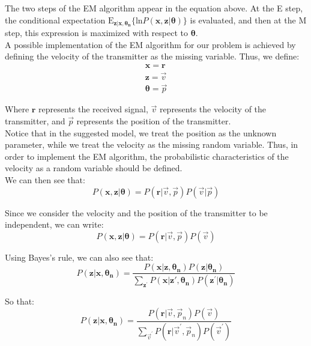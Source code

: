 \documentclass[10pt,a4paper]{report}
\begin{document}
The two steps of the EM algorithm appear in the equation above. At the E step, the conditional expectation $\text{E}_{\mathbf{z}|\mathbf{x,\theta_n}}\{\text{ln}P(\mathbf{x,z|\theta}) \}$ is evaluated, and then at the M step, this expression is maximized with respect to $\mathbf{\theta}$.\\

A possible implementation of the EM algorithm for our problem is achieved by defining the velocity of the transmitter as the missing variable. Thus, we define:
\begin{eqnarray}
\mathbf{x}=\mathbf{r}\\
\mathbf{z} = \vec{v}\\
\mathbf{\theta} = \vec{p}
\end{eqnarray}

Where $\mathbf{r}$ represents the received signal, $\vec{v}$ represents the velocity of the transmitter, and $\vec{p}$ represents the position of the transmitter.\\

Notice that in the suggested model, we treat the position as the unknown parameter, while we treat the velocity as the missing random variable. Thus, in order to implement the EM algorithm, the probabilistic characteristics of the velocity as a random variable should be defined.\\

We can then see that:
\begin{equation}
P(\mathbf{x,z|\theta}) = P(\mathbf{r}|\vec{v},\vec{p})P(\vec{v}|\vec{p})
\end{equation}

Since we consider the velocity and the position of the transmitter to be independent, we can write:
\begin{equation}
P(\mathbf{x,z|\theta}) = P(\mathbf{r}|\vec{v},\vec{p})P(\vec{v})
\end{equation}

Using Bayes's rule, we can also see that:
\begin{equation}
P(\mathbf{z|x,\theta_n}) = \frac{P(\mathbf{x|z,\theta_n})P(\mathbf{z|\theta_n })}{\sum_{\mathbf{z^{'}}} P(\mathbf{x|z{'},\theta_n})P(\mathbf{z^{'}|\theta_n})}
\end{equation}

So that:
\begin{equation}
P(\mathbf{z|x,\theta_n}) = \frac{P(\mathbf{r}|\vec{v},\vec{p}_n)P(\vec{v})}{\sum_{\vec{v}^{'}} P(\mathbf{r}|\vec{v}^{'},\vec{p}_n)P(\vec{v}^{'})}
\end{equation}
\end{document}
